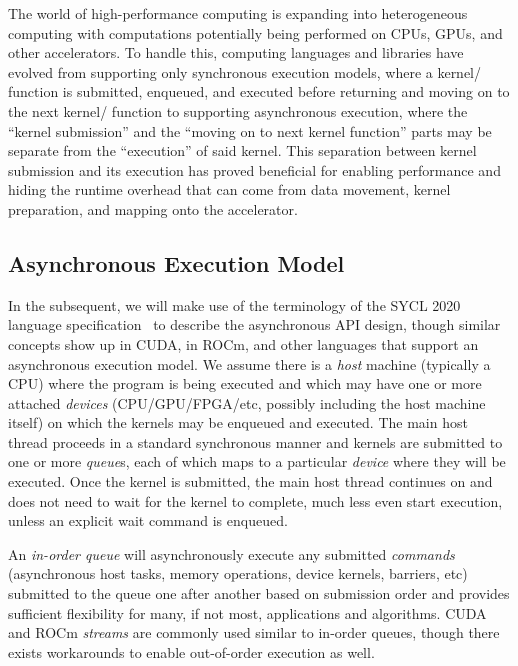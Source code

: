 \documentclass{article}
\begin{document}
The world of high-performance computing is expanding into heterogeneous computing with computations potentially being performed on CPUs, GPUs, and other accelerators.  To handle this, computing languages and libraries have evolved from supporting only synchronous execution models, where a kernel/ function is submitted, enqueued, and executed before returning and moving on to the next kernel/ function to supporting asynchronous execution, where the ``kernel submission'' and the ``moving on to next kernel function'' parts may be separate from the ``execution'' of said kernel.  This separation between kernel submission and its execution has proved beneficial for enabling performance and hiding the runtime overhead that can come from data movement, kernel preparation, and mapping onto the accelerator.

\subsection{Asynchronous Execution Model}

In the subsequent, we will make use of the terminology of the SYCL 2020 language specification~\cite{SYCL2020Specification} to describe the asynchronous API design, though similar concepts show up in CUDA, in ROCm, and other languages that support an asynchronous execution model. We assume there is a \textit{host} machine (typically a CPU) where the program is being executed and which may have one or more attached \textit{devices} (CPU/GPU/FPGA/etc, possibly including the host machine itself) on which the kernels may be enqueued and executed.  The main host thread proceeds in a standard synchronous manner and kernels are submitted to one or more \textit{queue}s, each of which maps to a particular \textit{device} where they will be executed. Once the kernel is submitted, the main host thread continues on and does not need to wait for the kernel to complete, much less even start execution, unless an explicit wait command is enqueued. 

An \textit{in-order queue} will asynchronously execute any submitted \textit{commands} (asynchronous host tasks, memory operations, device kernels, barriers, etc) submitted to the queue one after another based on submission order and provides sufficient flexibility for many, if not most, applications and algorithms. CUDA and ROCm \textit{streams} are commonly used similar to in-order queues, though there exists workarounds to enable out-of-order execution as well. 

\end{document}
